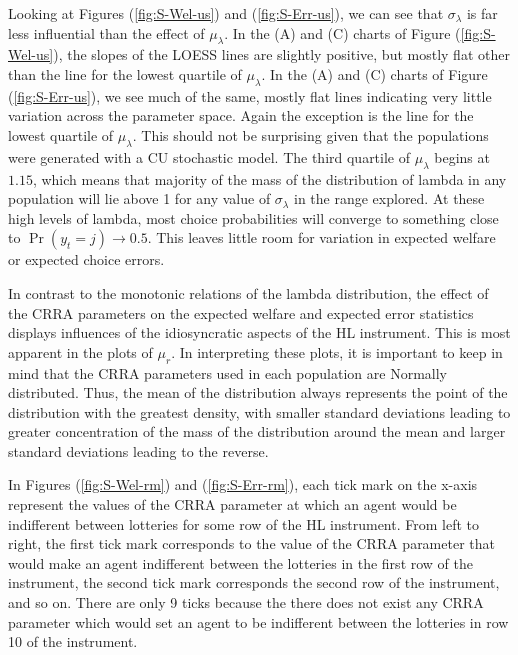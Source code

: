 \documentclass[../main.tex]{subfiles}
\begin{document}
\addtocounter{footnote}{-1}

Looking at Figures (\ref{fig:S-Wel-us}) and (\ref{fig:S-Err-us}), we can see that $\sigma_\lambda$ is far less influential than the effect of $\mu_\lambda$.
In the (A) and (C) charts of Figure (\ref{fig:S-Wel-us}), the slopes of the LOESS lines are slightly positive, but mostly flat other than the line for the lowest quartile of $\mu_\lambda$.
In the (A) and (C) charts of Figure (\ref{fig:S-Err-us}), we see much of the same, mostly flat lines indicating very little variation across the parameter space.
Again the exception is the line for the lowest quartile of $\mu_\lambda$.
This should not be surprising given that the populations were generated with a CU stochastic model.
The third quartile of $\mu_\lambda$ begins at $1.15$, which means that majority of the mass of the distribution of lambda in any population will lie above 1 for any value of $\sigma_\lambda$ in the range explored.
At these high levels of lambda, most choice probabilities will converge to something close to $\Pr( y_t = j) \to 0.5$.
This leaves little room for variation in expected welfare or expected choice errors.

In contrast to the monotonic relations of the lambda distribution, the effect of the CRRA parameters on the expected welfare and expected error statistics displays influences of the idiosyncratic aspects of the HL instrument.
This is most apparent in the plots of $\mu_r$.
In interpreting these plots, it is important to keep in mind that the CRRA parameters used in each population are Normally distributed.
Thus, the mean of the distribution always represents the point of the distribution with the greatest density, with smaller standard deviations leading to greater concentration of the mass of the distribution around the mean and larger standard deviations leading to the reverse.

In Figures (\ref{fig:S-Wel-rm}) and (\ref{fig:S-Err-rm}), each tick mark on the x-axis represent the values of the CRRA parameter at which an agent would be indifferent between lotteries for some row of the HL instrument.
From left to right, the first tick mark corresponds to the value of the CRRA parameter that would make an agent indifferent between the lotteries in the first row of the instrument, the second tick mark corresponds the second row of the instrument, and so on.
There are only 9 ticks because the there does not exist any CRRA parameter which would set an agent to be indifferent between the lotteries in row 10 of the instrument.
\end{document}
